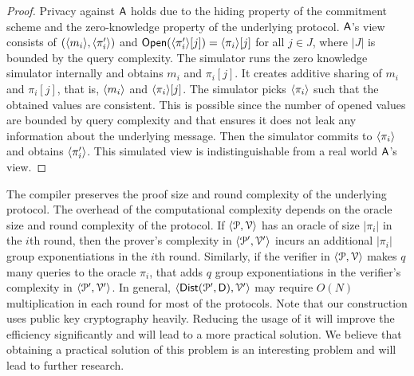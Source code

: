 \begin{proof}
	Privacy against $\mathsf{A}$ holds due to the hiding property of the commitment scheme and the zero-knowledge property of the underlying protocol. $\mathsf{A}$'s view consists of $(\langle m_i \rangle, \langle \pi'_i \rangle)$ and $\mathsf{Open}(\langle \pi'_i \rangle[j]) = \langle \pi_i \rangle[j]$ for all $j \in J$, where $|J|$ is bounded by the query complexity. 
	The simulator runs the zero knowledge simulator internally and obtains $m_i$ and $\pi_i[j]$. It creates additive sharing of $m_i$ and $\pi_i[j]$, that is, $\langle m_i \rangle$ and $\langle \pi_i \rangle[j]$. The simulator picks $\langle \pi_i \rangle$ such that the obtained values are consistent. This is possible since the number of opened values are bounded by query complexity and that ensures it does not leak any information about the underlying message. Then the simulator commits to $\langle \pi_i \rangle$ and obtains $\langle \pi'_i \rangle$. This simulated view is indistinguishable from a real world $\mathsf{A}$'s view.
\end{proof}

The compiler preserves the proof size and round complexity of the underlying protocol. The overhead of the computational complexity depends on the oracle size and round complexity of the protocol. If $\langle \mathcal{P},\mathcal{V}\rangle$ has an oracle of size $|\pi_i|$ in the $i$th round, then the prover's complexity in $\langle \mathcal{P}',\mathcal{V}'\rangle$ incurs an additional $|\pi_i|$ group exponentiations in the $i$th round. Similarly, if the verifier in $\langle \mathcal{P},\mathcal{V}\rangle$ makes $q$ many queries to the oracle $\pi_i$, that adds $q$ group exponentiations in the verifier's complexity in $\langle \mathcal{P}',\mathcal{V}'\rangle$. In general, $\langle \mathsf{Dist}(\mathcal{P}', \mathsf{D}),\mathcal{V}'\rangle$ may require $O(N)$ multiplication in each round for most of the protocols.
Note that our construction uses public key cryptography heavily. Reducing the usage of it will improve the efficiency significantly and will lead to a more practical solution. We believe that obtaining a practical solution of this problem is an interesting problem and will lead to further research.